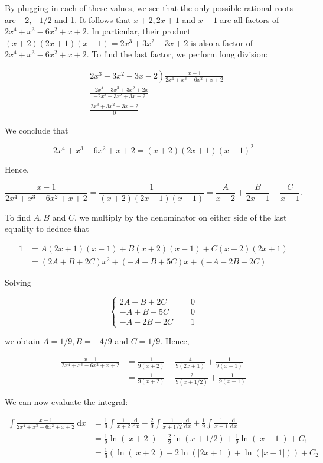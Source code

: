\documentclass[10pt]{article}
\begin{document}
By plugging in each of these values, we see that the only possible rational roots are $-2,-1 / 2$ and 1. It follows that $x+2,2 x+1$ and $x-1$ are all factors of $2 x^{4}+x^{3}-6 x^{2}+x+2$. In particular, their product $(x+2)(2 x+1)(x-1)=2 x^{3}+3 x^{2}-3 x+2$ is also a factor of $2 x^{4}+x^{3}-6 x^{2}+x+2$. To find the last factor, we perform long division:

$$
\begin{aligned}
& \left.2 x^{3}+3 x^{2}-3 x-2\right) \frac{x-1}{2 x^{4}+x^{3}-6 x^{2}+x+2} \\
& \frac{-2 x^{4}-3 x^{3}+3 x^{2}+2 x}{-2 x^{3}-3 x^{2}+3 x+2} \\
& \frac{2 x^{3}+3 x^{2}-3 x-2}{0}
\end{aligned}
$$

We conclude that

$$
2 x^{4}+x^{3}-6 x^{2}+x+2=(x+2)(2 x+1)(x-1)^{2}
$$

Hence,

$$
\frac{x-1}{2 x^{4}+x^{3}-6 x^{2}+x+2}=\frac{1}{(x+2)(2 x+1)(x-1)}=\frac{A}{x+2}+\frac{B}{2 x+1}+\frac{C}{x-1} .
$$

To find $A, B$ and $C$, we multiply by the denominator on either side of the last equality to deduce that

$$
\begin{aligned}
1 & =A(2 x+1)(x-1)+B(x+2)(x-1)+C(x+2)(2 x+1) \\
& =(2 A+B+2 C) x^{2}+(-A+B+5 C) x+(-A-2 B+2 C)
\end{aligned}
$$

Solving

$$
\left\{\begin{aligned}
2 A+B+2 C & =0 \\
-A+B+5 C & =0 \\
-A-2 B+2 C & =1
\end{aligned}\right.
$$

we obtain $A=1 / 9, B=-4 / 9$ and $C=1 / 9$. Hence,

$$
\begin{aligned}
\frac{x-1}{2 x^{4}+x^{3}-6 x^{2}+x+2} & =\frac{1}{9(x+2)}-\frac{4}{9(2 x+1)}+\frac{1}{9(x-1)} \\
& =\frac{1}{9(x+2)}-\frac{2}{9(x+1 / 2)}+\frac{1}{9(x-1)}
\end{aligned}
$$

We can now evaluate the integral:

$$
\begin{aligned}
\int \frac{x-1}{2 x^{4}+x^{3}-6 x^{2}+x+2} \mathrm{~d} x & =\frac{1}{9} \int \frac{1}{x+2} \frac{\mathrm{~d}}{\mathrm{~d} x}-\frac{2}{9} \int \frac{1}{x+1 / 2} \frac{\mathrm{~d}}{\mathrm{~d} x}+\frac{1}{9} \int \frac{1}{x-1} \frac{\mathrm{~d}}{\mathrm{~d} x} \\
& =\frac{1}{9} \ln (|x+2|)-\frac{2}{9} \ln (x+1 / 2)+\frac{1}{9} \ln (|x-1|)+C_{1} \\
& =\frac{1}{9}(\ln (|x+2|)-2 \ln (|2 x+1|)+\ln (|x-1|))+C_{2}
\end{aligned}
$$
\end{document}

